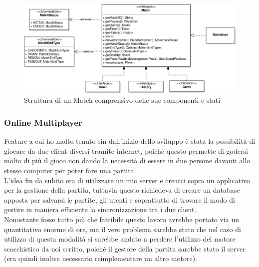 \documentclass[a4paper,12pt]{report}
\begin{document}
\begin{figure}[H]
    \begin{center}
        \centering
        \includegraphics[width=\textwidth]{img/Alessandro/match.png}
    \end{center}
    \caption{Struttura di un Match comprensivo delle sue componenti e stati}
    \label{img:match}
\end{figure}

\subsubsection{Online Multiplayer}
Feature a cui ho molto tenuto sin dall'inizio dello sviluppo è stata la possibilità di giocare da due client diversi tramite internet, poiché questo permette di godersi molto di più il gioco non dando la necessità di essere in due persone davanti allo stesso computer per poter fare una partita.
\\
L'idea fin da subito era di utilizzare un mio server e crearci sopra un applicativo per la gestione della partita, tuttavia questo richiedeva di creare un database apposta per salvarsi le partite, gli utenti e soprattutto di trovare il modo di gestire in maniera efficiente la sincronizzazione tra i due client.
\\
Nonostante fosse tutto più che fattibile questo lavoro avrebbe portato via un quantitativo enorme di ore, ma il vero problema sarebbe stato che nel caso di utilizzo di questa modalità si sarebbe andato a perdere l'utilizzo del motore scacchistico da noi scritto, poiché il gestore della partita sarebbe stato il server (era quindi inoltre necessario reimplementare un altro motore).
\end{document}
